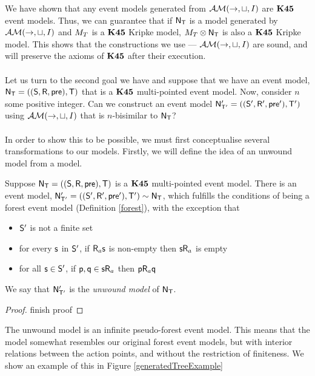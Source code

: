 We have shown that any event models generated from $\mathcal{AM}(\to,\sqcup, I)$ are
$\bf K45$ event models.
Thus, we can guarantee that if $\mathrm{\mathsf{N}}_\mathrm{\mathsf{T}}$ is a model generated by
$\mathcal{AM}(\to,\sqcup,I)$ and $M_T$ is a $\bf K45$ Kripke model, $M_T
\otimes \mathrm{\mathsf{N}}_\mathrm{\mathsf{T}}$ is also a $\bf K45$ Kripke model.
This shows that the constructions we use --- $\mathcal{AM}(\to, \sqcup, I)$ are
sound, and will preserve the axioms of $\bf K45$ after their execution.\\
\\
Let us turn to the second goal we have and suppose that we have an event model, $\mathrm{\mathsf{N}}_\mathrm{\mathsf{T}}
= ((\mathrm{\mathsf{S}},\mathrm{\mathsf{R}},\mathrm{\mathsf{pre}}),\mathrm{\mathsf{T}})$ that is a $\bf K45$ multi-pointed event model.
Now, consider $n$ some positive integer.
Can we construct an event model $\mathrm{\mathsf{N}}'_{\mathrm{\mathsf{T}}'} = ((\mathrm{\mathsf{S}}',\mathrm{\mathsf{R}}',\mathrm{\mathsf{pre}}'),\mathrm{\mathsf{T}}')$
using $\mathcal{AM}(\to,\sqcup,I)$ that is $n$-bisimilar to $\mathrm{\mathsf{N}}_\mathrm{\mathsf{T}}$?\\
\\
In order to show this to be possible, we must first conceptualise several
transformations to our models.
Firstly, we will define the idea of an unwound model from a model.

\begin{lemma} \label{unwoundModel}
  Suppose $\mathrm{\mathsf{N}}_\mathrm{\mathsf{T}} = ((\mathrm{\mathsf{S}},\mathrm{\mathsf{R}},\mathrm{\mathsf{pre}}),\mathrm{\mathsf{T}})$ is a $\bf K45$ multi-pointed
  event model.
  There is an event model, $\mathrm{\mathsf{N}}'_{\mathrm{\mathsf{T}}'} = ((\mathrm{\mathsf{S}}',\mathrm{\mathsf{R}}',\mathrm{\mathsf{pre}}'),\mathrm{\mathsf{T}}') \sim
  \mathrm{\mathsf{N}}_\mathrm{\mathsf{T}}$, which fulfills the conditions of being a forest event model
  (Definition \ref{forest}), with the exception that
  \begin{itemize}
    \item $\mathrm{\mathsf{S}}'$ is not a finite set
    \item for every $\mathrm{\mathsf{s}}$ in $\mathrm{\mathsf{S}}'$, if $\mathrm{\mathsf{R}}_a \mathrm{\mathsf{s}}$ is non-empty then
    $\mathrm{\mathsf{s}} \mathrm{\mathsf{R}}_a$ is empty
    \item for all $\mathrm{\mathsf{s}} \in \mathrm{\mathsf{S}}'$, if $\mathrm{\mathsf{p}}, \mathrm{\mathsf{q}} \in \mathrm{\mathsf{s}} \mathrm{\mathsf{R}}_a$ then $\mathrm{\mathsf{p}}
    \mathrm{\mathsf{R}}_a \mathrm{\mathsf{q}}$
  \end{itemize}
  We say that $\mathrm{\mathsf{N}}'_{\mathrm{\mathsf{T}}'}$ is the {\em unwound model} of $\mathrm{\mathsf{N}}_\mathrm{\mathsf{T}}$.
\end{lemma}
\begin{proof}
  \FIXME finish proof
\end{proof}

The unwound model is an infinite pseudo-forest event model.
This means that the model somewhat resembles our original forest event models,
but with interior relations between the action points, and without the
restriction of finiteness.
We show an example of this in Figure \ref{generatedTreeExample}

